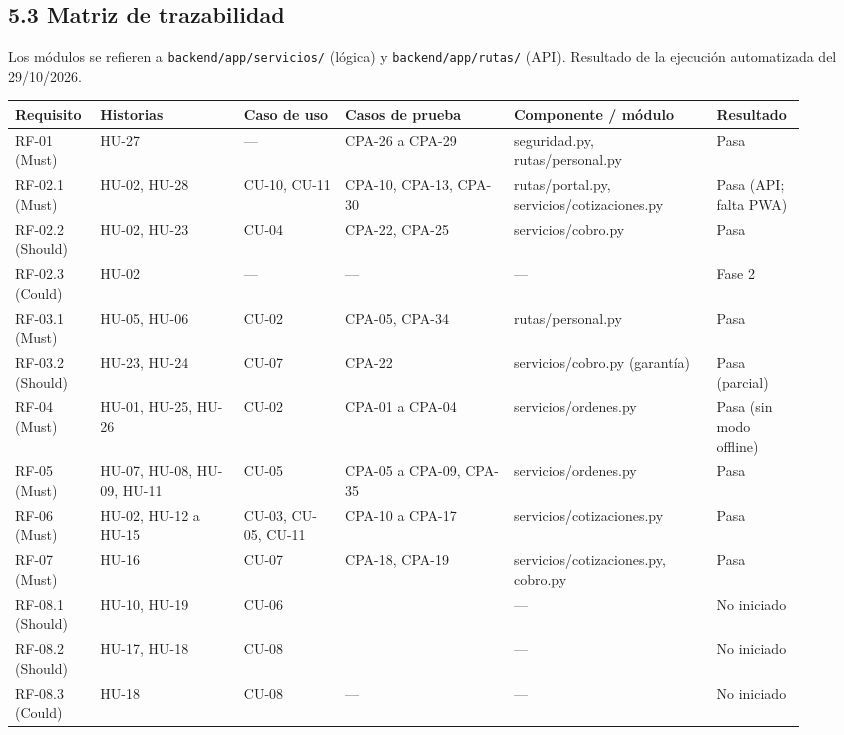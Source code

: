 \subsection{5.3 Matriz de trazabilidad}\label{matriz-de-trazabilidad}

Los módulos se refieren a \texttt{backend/app/servicios/} (lógica) y \texttt{backend/app/rutas/} (API).
Resultado de la ejecución automatizada del 29/10/2026.

{\footnotesize
\begin{longtable}{@{}L{0.09\linewidth}L{0.17\linewidth}L{0.12\linewidth}L{0.2\linewidth}L{0.24\linewidth}L{0.1\linewidth}@{}}
\toprule
\textbf{Requisito} & \textbf{Historias} & \textbf{Caso de uso} & \textbf{Casos de prueba} & \textbf{Componente / módulo} & \textbf{Resultado} \\
\midrule
\endhead
\bottomrule
\endlastfoot
RF-01 (Must) & HU-27 & --- & CPA-26 a CPA-29 & seguridad.py, rutas/personal.py & Pasa \\
RF-02.1 (Must) & HU-02, HU-28 & CU-10, CU-11 & CPA-10, CPA-13, CPA-30 & rutas/portal.py, servicios/cotizaciones.py & Pasa (API; falta PWA) \\
RF-02.2 (Should) & HU-02, HU-23 & CU-04 & CPA-22, CPA-25 & servicios/cobro.py & Pasa \\
RF-02.3 (Could) & HU-02 & --- & --- & --- & Fase 2 \\
RF-03.1 (Must) & HU-05, HU-06 & CU-02 & CPA-05, CPA-34 & rutas/personal.py & Pasa \\
RF-03.2 (Should) & HU-23, HU-24 & CU-07 & CPA-22 & servicios/cobro.py (garantía) & Pasa (parcial) \\
RF-04 (Must) & HU-01, HU-25, HU-26 & CU-02 & CPA-01 a CPA-04 & servicios/ordenes.py & Pasa (sin modo offline) \\
RF-05 (Must) & HU-07, HU-08, HU-09, HU-11 & CU-05 & CPA-05 a CPA-09, CPA-35 & servicios/ordenes.py & Pasa \\
RF-06 (Must) & HU-02, HU-12 a HU-15 & CU-03, CU-05, CU-11 & CPA-10 a CPA-17 & servicios/cotizaciones.py & Pasa \\
RF-07 (Must) & HU-16 & CU-07 & CPA-18, CPA-19 & servicios/cotizaciones.py, cobro.py & Pasa \\
RF-08.1 (Should) & HU-10, HU-19 & CU-06 &  & --- & No iniciado \\
RF-08.2 (Should) & HU-17, HU-18 & CU-08 &  & --- & No iniciado \\
RF-08.3 (Could) & HU-18 & CU-08 & --- & --- & No iniciado \\

\end{longtable}}
